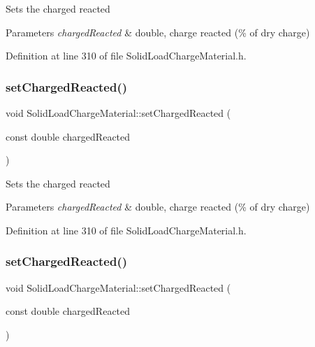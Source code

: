 Sets the charged reacted 
\begin{DoxyParams}{Parameters}
{\em charged\+Reacted} & double, charge reacted (\% of dry charge) \\
\hline
\end{DoxyParams}


Definition at line 310 of file Solid\+Load\+Charge\+Material.\+h.

\mbox{\label{class_solid_load_charge_material_a38f3b832ff29f779a78a51fd7352fcd4}} 
\subsubsection{\texorpdfstring{set\+Charged\+Reacted()}{setChargedReacted()}\hspace{0.1cm}{\footnotesize\ttfamily [2/3]}}
{\footnotesize\ttfamily void Solid\+Load\+Charge\+Material\+::set\+Charged\+Reacted (\begin{DoxyParamCaption}\item[{const double}]{charged\+Reacted }\end{DoxyParamCaption})\hspace{0.3cm}{\ttfamily [inline]}}

Sets the charged reacted 
\begin{DoxyParams}{Parameters}
{\em charged\+Reacted} & double, charge reacted (\% of dry charge) \\
\hline
\end{DoxyParams}


Definition at line 310 of file Solid\+Load\+Charge\+Material.\+h.

\mbox{\label{class_solid_load_charge_material_a38f3b832ff29f779a78a51fd7352fcd4}} 
\subsubsection{\texorpdfstring{set\+Charged\+Reacted()}{setChargedReacted()}\hspace{0.1cm}{\footnotesize\ttfamily [3/3]}}
{\footnotesize\ttfamily void Solid\+Load\+Charge\+Material\+::set\+Charged\+Reacted (\begin{DoxyParamCaption}\item[{const double}]{charged\+Reacted }\end{DoxyParamCaption})\hspace{0.3cm}{\ttfamily [inline]}}

